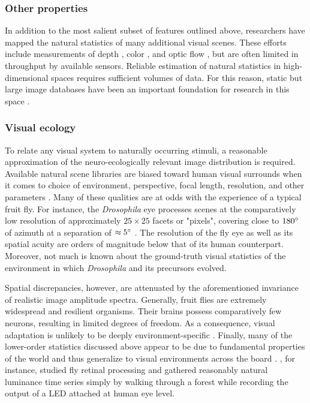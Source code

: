 \subsubsection{Other properties}
In addition to the most salient subset of features outlined above, researchers have mapped the natural statistics of many additional visual scenes. These efforts include measurements of depth \citep{Huang:2000aa}, color \citep{Ruderman:1998aa,Wachtler:2001aa}, and optic flow \citep{Roth:2005aa,Roth:2007bg}, but are often limited in throughput by available sensors. Reliable estimation of natural statistics in high-dimensional spaces requires sufficient volumes of data. For this reason, static but large image databases have been an important foundation for research in this space \citep{vanHateren:1998jt}.

\subsubsection{Visual ecology}
To relate any visual system to naturally occurring stimuli, a reasonable approximation of the neuro-ecologically relevant image distribution is required. Available natural scene libraries are biased toward human visual surrounds when it comes to choice of environment, perspective, focal length, resolution, and other parameters \citep{Tkacik:2011aa}. Many of these qualities are at odds with the experience of a typical fruit fly. For instance, the \textit{Drosophila} eye processes scenes at the comparatively low resolution of approximately $25 \times 25$ facets or "pixels", covering close to $180\degree$ of azimuth at a separation of $\approx5\degree$ \citep{Borst:2009gv}. The resolution of the fly eye as well as its spatial acuity are orders of magnitude below that of its human counterpart. Moreover, not much is known about the ground-truth visual statistics of the environment in which \textit{Drosophila} and its precursors evolved.

Spatial discrepancies, however, are attenuated by the aforementioned invariance of realistic image amplitude spectra. Generally, fruit flies are extremely widespread and resilient organisms. Their brains possess comparatively few neurons, resulting in limited degrees of freedom. As a consequence, visual adaptation is unlikely to be deeply environment-specific \citep{Dickinson:2014aa}. Finally, many of the lower-order statistics discussed above appear to be due to fundamental properties of the world and thus generalize to visual environments across the board \citep{Geisler:2008gu,Simoncelli:2001dn}. \citet{vanHateren:1997vg}, for instance, studied fly retinal processing and gathered reasonably natural luminance time series simply by walking through a forest while recording the output of a LED attached at human eye level.

